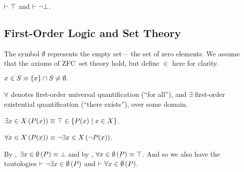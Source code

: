 %
%
\begin{definition}
  $\vdash\top$ and $\vdash\neg\bot$.
\end{definition}


\subsection{First-Order Logic and Set Theory}
\indexsym{}
The symbol $\emptyset$ represents the empty set---%
  the set of zero elements.
We assume that the axioms of ZFC~set theory hold,
  but define $\in$ here for clarity.

\indexsym{}
\indexsym{}
\indexsym{}
\begin{definition}
  $x \in S \equiv \left\{x\right\} \cap S \not= \emptyset.$
\end{definition}

$\forall$ denotes first-order universal quantification (``for all''),
  and $\exists$ first-order existential quantification (``there exists''),
  over some domain.

\indexsym{}
\begin{definition}
  $\Exists{x\in X}{P(x)} \equiv
    \true \in \Set{P(x) \mid x\in X}$.
\end{definition}

\indexsym{}
\begin{definition}
  $\Forall{x\in X}{P(x)} \equiv \neg\Exists{x\in X}{\neg P(x)}$.
\end{definition}

\begin{remark}
  By , $\Exists{x\in\emptyset}P \equiv \false$
    and by , $\Forall{x\in\emptyset}P \equiv \true$.
  And so we also have the tautologies $\infer \neg\Exists{x\in\emptyset}P$
    and $\infer \Forall{x\in\emptyset}P$.
\end{remark}

